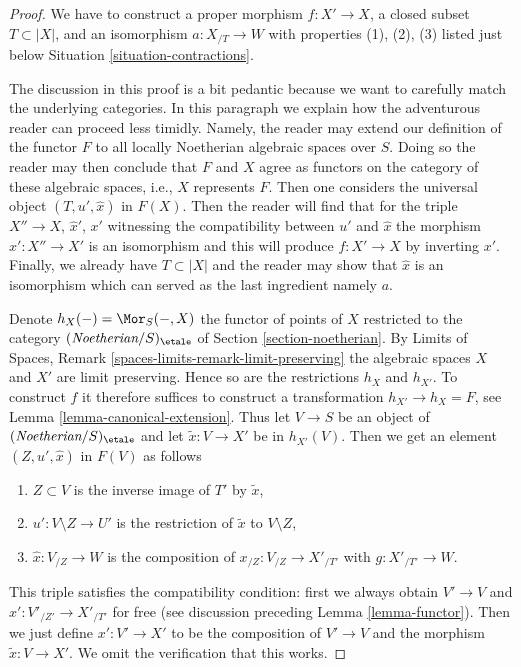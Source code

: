 \begin{proof}
We have to construct a proper morphism $f : X' \to X$, a closed subset
$T \subset |X|$, and an isomorphism $a : X_{/T} \to W$ with properties
(1), (2), (3) listed just below Situation \ref{situation-contractions}.

\medskip\noindent
The discussion in this proof is a bit pedantic because we want
to carefully match the underlying categories. In this paragraph
we explain how the adventurous reader can proceed less timidly.
Namely, the reader may extend our definition of the functor $F$
to all locally Noetherian algebraic spaces over $S$.
Doing so the reader may then conclude that $F$ and $X$ agree as
functors on the category of these algebraic spaces, i.e.,
$X$ represents $F$. Then one considers the universal object
$(T, u', \hat x)$ in $F(X)$. Then the reader will find that
for the triple $X'' \to X$, $\hat x'$, $x'$ witnessing the compatibility
between $u'$ and $\hat x$ the morphism $x' : X'' \to X'$ is an isomorphism
and this will produce $f : X' \to X$ by inverting $x'$. Finally, we already
have $T \subset |X|$ and the reader may show that $\hat x$ is an isomorphism
which can served as the last ingredient namely $a$.

\medskip\noindent
Denote $h_X(-) = \Mor_S(-, X)$ the functor of
points of $X$ restricted to the category
$(\textit{Noetherian}/S)_\etale$ of Section \ref{section-noetherian}.
By Limits of Spaces, Remark \ref{spaces-limits-remark-limit-preserving}
the algebraic spaces $X$ and $X'$ are limit preserving. Hence so
are the restrictions $h_X$ and $h_{X'}$.
To construct $f$ it therefore suffices to construct a
transformation $h_{X'} \to h_X = F$, see Lemma \ref{lemma-canonical-extension}.
Thus let $V \to S$ be an object of $(\textit{Noetherian}/S)_\etale$
and let $\tilde x : V \to X'$ be in $h_{X'}(V)$.
Then we get an element $(Z, u', \hat x)$ in $F(V)$ as follows
\begin{enumerate}
\item $Z \subset V$ is the inverse image of $T'$ by $\tilde x$,
\item $u' : V \setminus Z \to U'$ is the restriction of
$\tilde x$ to $V \setminus Z$,
\item $\hat x : V_{/Z} \to W$ is the composition of
$x_{/Z} : V_{/Z} \to X'_{/T'}$ with $g : X'_{/T'} \to W$.
\end{enumerate}
This triple satisfies the compatibility condition: first we always
obtain $V' \to V$ and $\hat x' : V'_{/Z'} \to X'_{/T'}$ for free
(see discussion preceding Lemma \ref{lemma-functor}).
Then we just define $x' : V' \to X'$ to be the composition
of $V' \to V$ and the morphism $\tilde x : V \to X'$.
We omit the verification that this works.


\end{proof}

